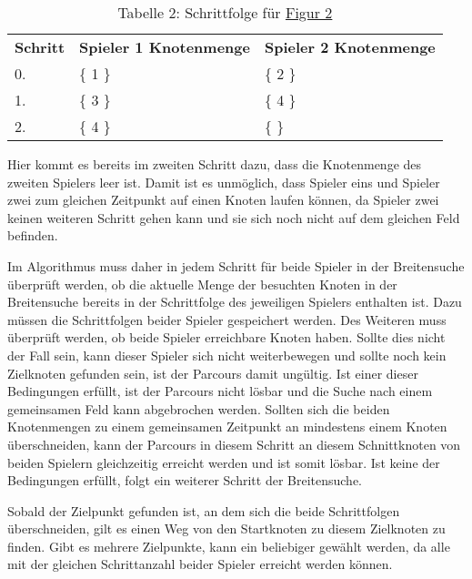 \documentclass[a4paper,10pt,ngerman]{scrartcl}
\begin{document}
    \begin{table}[!h]
        \centering
        \begin{tabular}{lll}
            \textbf{Schritt} & \textbf{Spieler 1 Knotenmenge} & \textbf{Spieler 2 Knotenmenge} \\
            0.               & \{ 1 \}                        & \{ 2 \}                        \\
            1.               & \{ 3 \}                        & \{ 4 \}                        \\
            2.               & \{ 4 \}                        & \{   \}                           \\
        \end{tabular}
        \caption{Tabelle 2: Schrittfolge für \hyperref[fig:Figure2]{Figur 2}}
        \label{tab:Table2}
    \end{table}

    Hier kommt es bereits im zweiten Schritt dazu, dass die Knotenmenge des zweiten Spielers leer ist.
    Damit ist es unmöglich,
    dass Spieler eins und Spieler zwei zum gleichen Zeitpunkt auf einen Knoten laufen können,
    da Spieler zwei keinen weiteren Schritt gehen kann
    und sie sich noch nicht auf dem gleichen Feld befinden.

    Im Algorithmus muss daher in jedem Schritt für beide Spieler in der Breitensuche überprüft werden,
    ob die aktuelle Menge der besuchten Knoten in der Breitensuche
    bereits in der Schrittfolge des jeweiligen Spielers enthalten ist.
    Dazu müssen die Schrittfolgen beider Spieler gespeichert werden.
    Des Weiteren muss überprüft werden, ob beide Spieler erreichbare Knoten haben.
    Sollte dies nicht der Fall sein, kann dieser Spieler sich nicht weiterbewegen
    und sollte noch kein Zielknoten gefunden sein, ist der Parcours damit ungültig.
    Ist einer dieser Bedingungen erfüllt, ist der Parcours nicht lösbar
    und die Suche nach einem gemeinsamen Feld kann abgebrochen werden.
    Sollten sich die beiden Knotenmengen zu einem gemeinsamen Zeitpunkt an mindestens einem Knoten überschneiden,
    kann der Parcours in diesem Schritt an diesem Schnittknoten von beiden Spielern gleichzeitig erreicht werden
    und ist somit lösbar.
    Ist keine der Bedingungen erfüllt,
    folgt ein weiterer Schritt der Breitensuche.

    Sobald der Zielpunkt gefunden ist,
    an dem sich die beide Schrittfolgen überschneiden,
    gilt es einen Weg von den Startknoten zu diesem Zielknoten zu finden.
    Gibt es mehrere Zielpunkte, kann ein beliebiger gewählt werden,
    da alle mit der gleichen Schrittanzahl beider Spieler erreicht werden können.
\end{document}
